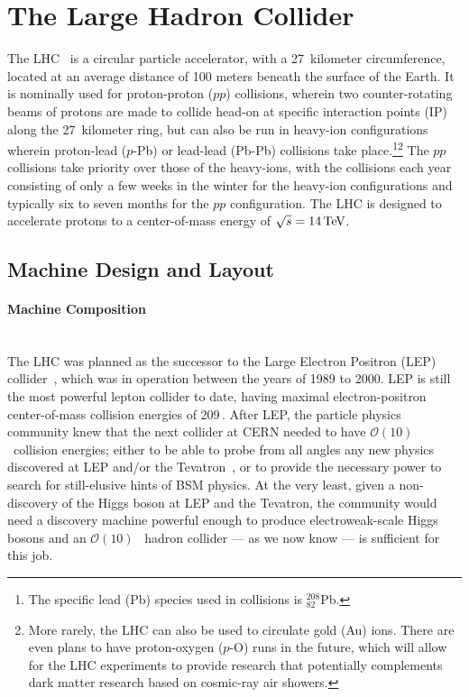 \section{The Large Hadron Collider}
\label{sec:lhc}

The LHC~\cite{LHCMachine} is a circular particle accelerator, with a 27~kilometer circumference,
located at an average distance of 100 meters beneath the surface of the Earth.
It is nominally used for proton-proton ($pp$) collisions, wherein two counter-rotating
beams of protons are made to collide head-on at specific interaction points (IP) along the 27~kilometer
ring, but can also be run in heavy-ion configurations wherein proton-lead ($p$-Pb) or lead-lead (Pb-Pb)
collisions take place.\footnote{The specific lead (Pb) species used in collisions is $^{208}_{82}$Pb.}\footnote{More rarely, the LHC can also be used to circulate gold (Au) ions.
There are even plans to have proton-oxygen ($p$-O) runs in the future, which will allow
for the LHC experiments to provide research that potentially complements dark matter research
based on cosmic-ray air showers.}
{\color{red}{Multi-year runs of the LHC, in which protons are circulating are referred to as `Runs'. There have been
two so far, Run-I and Run-II,... See Table... --- perhaps describe this or put table after lumi discussion?}}
The $pp$ collisions take priority over those of the heavy-ions, with the collisions each year
consisting of only a few weeks in the winter for the heavy-ion configurations and typically
six to seven months for the $pp$ configuration. The LHC is designed to accelerate protons to a
center-of-mass energy of $\sqrt{s} = 14\,\text{Te\kern -0.1em V}$.

\subsection{Machine Design and Layout}
\label{sec:lhc_layout}

\paragraph{Machine Composition} \mbox{} \\
\label{sec:dipole}
The LHC was planned as the successor to the Large Electron Positron (LEP) collider~\cite{LEPI,LEPII}, which was in operation
between the years of 1989 to 2000. LEP is still the most powerful lepton collider to date, having maximal electron-positron
center-of-mass collision energies of 209\,\GeV.
After LEP, the particle physics community knew that the next collider at CERN needed to have $\mathcal{O}(10)$\,\TeV~collision
energies; either to be able to probe from all angles any new physics discovered at LEP and/or the Tevatron~\cite{TevatronDesignI}, or
to provide the necessary power to search for still-elusive hints of BSM physics. At the very least,
given a non-discovery of the Higgs boson at LEP and the Tevatron, the community would need a discovery machine powerful enough
to produce electroweak-scale Higgs bosons and an $\mathcal{O}(10)$ \TeV~hadron collider --- as we now know --- is sufficient for this job.



